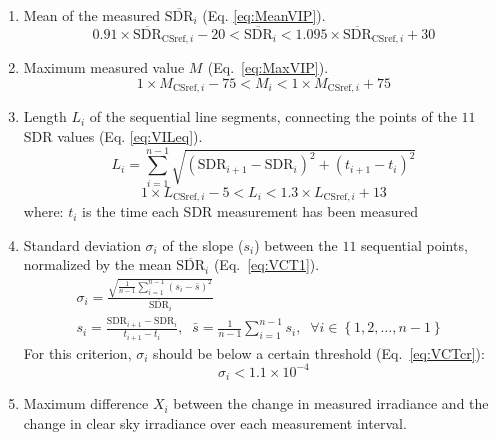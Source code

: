 \documentclass[
  preprint, 3p, authoryear]{article}
\providecommand{\tightlist}{%
  \setlength{\itemsep}{0pt}\setlength{\parskip}{0pt}}
\begin{document}
\begin{enumerate}
\def\labelenumi{\alph{enumi})}
\tightlist
\item
  Mean of the measured \(\overline{\text{SDR}}_i\) (Eq. \ref{eq:MeanVIP}).
  \begin{equation}
  0.91 \times \overline{\text{SDR}}_{\text{CSref},i} - 20
  < \overline{\text{SDR}}_i <
  1.095 \times \overline{\text{SDR}}_{\text{CSref},i} + 30
  \label{eq:MeanVIP}
  \end{equation}
\item
  Maximum measured value \(M_{\text{}}\) (Eq.~\ref{eq:MaxVIP}).
  \begin{equation}
  1 \times M_{\text{CSref},i} - 75
  < M_{\text{}i} <
  1 \times M_{\text{CSref},i} + 75
  \label{eq:MaxVIP}
  \end{equation}
\item
  Length \(L_i\) of the sequential line segments, connecting the points of the \(11\) SDR values (Eq. \ref{eq:VILeq}).
  \begin{equation}
  L_i = \sum_{i=1}^{n-1}\sqrt{\left ( \text{SDR}_{i+1} - \text{SDR}_{i}\right )^2 + \left ( t_{i+1} - t_i \right )^2}
  \label{eq:VILeq}
  \end{equation}
  \begin{equation}
  1 \times L_{\text{CSref},i} - 5 < L_i < 1.3 \times L_{\text{CSref},i} + 13
  \label{eq:VILcr}
  \end{equation}
  where: \(t_i\) is the time each SDR measurement has been measured
\item
  Standard deviation \(\sigma_i\) of the slope (\(s_i\)) between the \(11\) sequential points, normalized by the mean \(\overline{\text{SDR}}_i\) (Eq.~\ref{eq:VCT1}).
  \begin{gather}
    \sigma_i = \frac {\sqrt{\frac{1}{n-1} \sum_{i=1}^{n-1} \left( s_i - \bar{s} \right)^2}} {\overline{\text{SDR}}_i} \label{eq:VCT1} \\
    s_i = \frac{\text{SDR}_{i+1} - \text{SDR}_{i}}{t_{i+1} - t_i},\;\;   \bar{s} = \frac{1}{n-1} \sum_{i=1}^{n-1} s_i,\;\;\forall i \in \left \{ 1, 2, \ldots, n-1 \right \}\;\;
  \end{gather}
  For this criterion, \(\sigma_i\) should be below a certain threshold (Eq.~\ref{eq:VCTcr}):
  \begin{equation}
    \sigma_i < \ensuremath{1.1\times 10^{-4}} \label{eq:VCTcr}
  \end{equation}
\item
  Maximum difference \(X_i\) between the change in measured irradiance and the change in clear sky irradiance over each measurement interval.

\end{enumerate}
\end{document}

